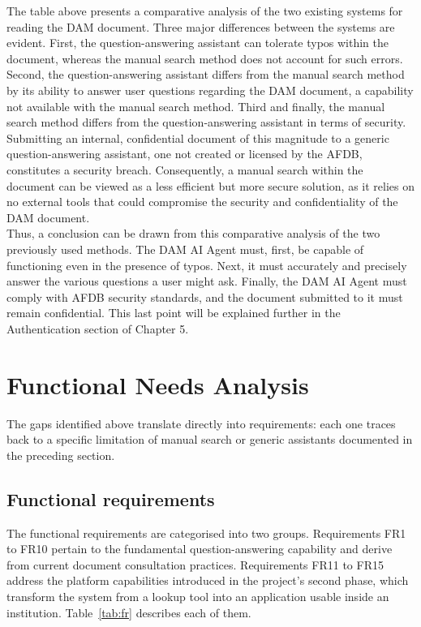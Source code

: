 The table above presents a comparative analysis of the two existing systems for reading the DAM document. Three major differences between the systems are evident.
First, the question-answering assistant can tolerate typos within the document, whereas the manual search method does not account for such errors.
Second, the question-answering assistant differs from the manual search method by its ability to answer user questions regarding the DAM document, a capability not available with the manual search method.
Third and finally, the manual search method differs from the question-answering assistant in terms of security. Submitting an internal, confidential document of this magnitude to a generic question-answering assistant, one not created or licensed by the AFDB, constitutes a security breach. Consequently, a manual search within the document can be viewed as a less efficient but more secure solution, as it relies on no external tools that could compromise the security and confidentiality of the DAM document.\\[0.2cm]
Thus, a conclusion can be drawn from this comparative analysis of the two previously used methods. The DAM AI Agent must, first, be capable of functioning even in the presence of typos. Next, it must accurately and precisely answer the various questions a user might ask. Finally, the DAM AI Agent must comply with AFDB security standards, and the document submitted to it must remain confidential. This last point will be explained further in the Authentication section of Chapter 5.

\section{Functional Needs Analysis}

The gaps identified above translate directly into requirements: each one traces back to a
specific limitation of manual search or generic assistants documented in the preceding
section.

\subsection{Functional requirements}

The functional requirements are categorised into two groups. Requirements FR1 to FR10 pertain to the fundamental question-answering capability and derive from current document consultation practices. Requirements FR11 to FR15 address the platform capabilities introduced in the project's second phase, which transform the system from a lookup tool into an application usable inside an institution. Table~\ref{tab:fr} describes each of them.

